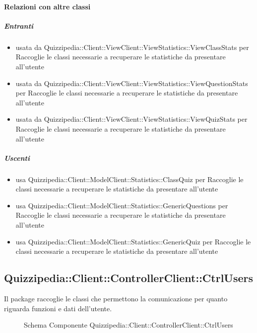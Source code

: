 \paragraph{Relazioni con altre classi}
\subparagraph{Entranti}
\begin{itemize}
\item usata da Quizzipedia::Client::ViewClient::ViewStatistics::ViewClassStats per Raccoglie le classi necessarie a recuperare le statistiche da presentare all'utente
\item usata da Quizzipedia::Client::ViewClient::ViewStatistics::ViewQuestionStats per Raccoglie le classi necessarie a recuperare le statistiche da presentare all'utente
\item usata da Quizzipedia::Client::ViewClient::ViewStatistics::ViewQuizStats per Raccoglie le classi necessarie a recuperare le statistiche da presentare all'utente
\end{itemize}
\subparagraph{Uscenti}
\begin{itemize}
\item usa Quizzipedia::Client::ModelClient::Statistics::ClassQuiz per Raccoglie le classi necessarie a recuperare le statistiche da presentare all'utente
\item usa Quizzipedia::Client::ModelClient::Statistics::GenericQuestions per Raccoglie le classi necessarie a recuperare le statistiche da presentare all'utente
\item usa Quizzipedia::Client::ModelClient::Statistics::GenericQuiz per Raccoglie le classi necessarie a recuperare le statistiche da presentare all'utente
\end{itemize}
\subsection{Quizzipedia::Client::ControllerClient::CtrlUsers}
Il package raccoglie le classi che permettono la comunicazione per quanto riguarda funzioni e dati dell'utente.
\begin{figure}[H]
\centering
\noindent{}
\caption[Schema Componente Quizzipedia::Client::ControllerClient::CtrlUsers]{Schema Componente Quizzipedia::Client::ControllerClient::CtrlUsers}
\end{figure}
